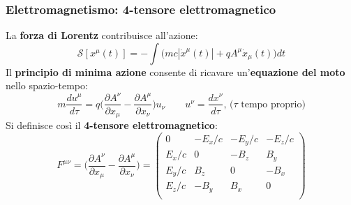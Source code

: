 \documentclass{beamer}
\begin{document}
\begin{frame}
    \frametitle{Elettromagnetismo: 4-tensore elettromagnetico}
    La \textbf{forza di Lorentz} contribuisce all'azione:
    $$\mathcal{S} [x^\mu(t)]=-\int\bigg(mc|\dot x^\mu(t)|+qA^\mu\dot x_\mu(t)\bigg)dt$$
    Il \textbf{principio di minima azione} consente di ricavare un'\textbf{equazione del moto} nello spazio-tempo:
    $$\boxed{m\frac{du^\mu}{d\tau}=q\bigg(\frac{\partial A^\nu}{\partial x_\mu}-\frac{\partial A^\mu}{\partial x_\nu}\bigg)u_\nu}\quad\quad u^\nu=\frac{dx^\nu}{d\tau}\text{, ($\tau$ tempo proprio)}$$ Si definisce così il \textbf{4-tensore elettromagnetico}:
    \begin{equation*}
        F^{\mu\nu}=\bigg(\frac{\partial A^\nu}{\partial x_\mu}-\frac{\partial A^\mu}{\partial x_\nu}\bigg)=\begin{pmatrix}
            0&-E_x/c&-E_y/c&-E_z/c\\
            E_x/c&0&-B_z&B_y\\
            E_y/c&B_z&0&-B_x\\
            E_z/c&-B_y&B_x&0\\
        \end{pmatrix}
    \end{equation*}
\end{frame}
\end{document}
